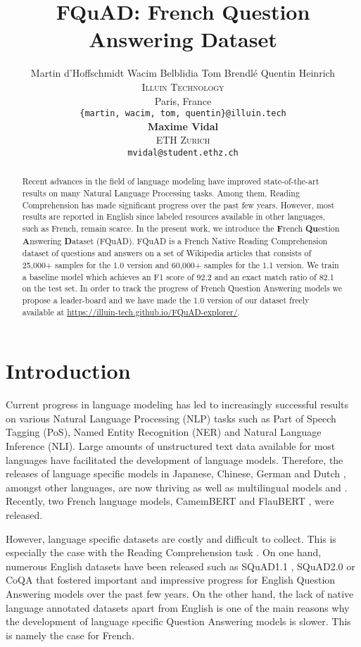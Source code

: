 \documentclass{article}
\title{FQuAD: French Question Answering Dataset}
\author{
    \normalsize Martin d'Hoffschmidt \hspace{0.3cm} \normalsize Wacim Belblidia \hspace{0.3cm} \normalsize Tom Brendlé \hspace{0.3cm} \normalsize Quentin Heinrich \\
    \normalsize \textsc{Illuin Technology} \\
    \normalsize Paris, France\\
    \normalsize \texttt{\{martin, wacim, tom, quentin\}@illuin.tech} \\
    \AND
    \normalsize {\bf Maxime Vidal} \hspace{0.3cm} \\
    \normalsize \textsc{ETH Zurich}\\
    \normalsize \texttt{mvidal@student.ethz.ch} \\
}
\begin{document}
\maketitle


\begin{abstract}
Recent advances in the field of language modeling have improved state-of-the-art results on many Natural Language Processing tasks.
Among them, Reading Comprehension has made significant progress over the past few years.
However, most results are reported in English since labeled resources available in other languages, such as French, remain scarce.
In the present work, we introduce the \textbf{F}rench \textbf{Qu}estion \textbf{A}nswering \textbf{D}ataset (FQuAD).
FQuAD is a French Native Reading Comprehension dataset of questions and answers on a set of Wikipedia articles that consists of 25,000+ samples for the 1.0 version and 60,000+ samples for the 1.1 version.
We train a baseline model which achieves an F1 score of 92.2 and an exact match ratio of 82.1 on the test set. 
In order to track the progress of French Question Answering models we propose a leader-board and we have made the 1.0 version of our dataset freely available at \url{https://illuin-tech.github.io/FQuAD-explorer/}.
 \end{abstract}

\section{Introduction}
\label{section:introduction}
Current progress in language modeling has led to increasingly successful results on various Natural Language Processing (NLP) tasks such as Part of Speech Tagging (PoS), Named Entity Recognition (NER) and Natural Language Inference (NLI).
Large amounts of unstructured text data available for most languages have facilitated the development of language models.
Therefore, the releases of language specific models in Japanese, Chinese, German and Dutch \citep{Vries2019BERTjeAD}, amongst other languages, are now thriving as well as multilingual models \citep{multilingual-bert} and \citep{xlmr}.
Recently, two French language models, CamemBERT \citep{camembert} and FlauBERT \citep{flaubert}, were released.

However, language specific datasets are costly and difficult to collect. 
This is especially the case with the Reading Comprehension task \citep{richardson-etal-2013-mctest}.
On one hand, numerous English datasets have been released such as SQuAD1.1 \citep{rajpurkar-etal-2016-squad}, SQuAD2.0 \citep{rajpurkar-squad-v2} or CoQA \citep{CoQA} that fostered important and impressive progress for English Question Answering models over the past few years.
On the other hand, the lack of native language annotated datasets apart from English is one of the main reasons why the development of language specific Question Answering models is slower.
This is namely the case for French.
\end{document}
